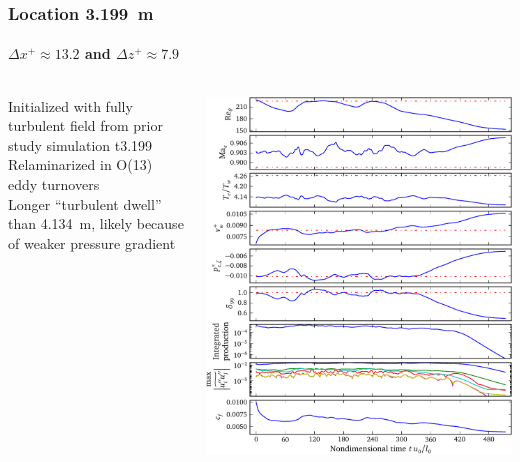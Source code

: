 \documentclass[mathserif]{beamer}
\begin{document}
\begin{frame}
    \frametitle{Location 3.199~m}
    \framesubtitle{$\Delta{}x^{+}\approx{}13.2$ and $\Delta{}z^{+}\approx{}7.9$}
    \begin{columns}[c,onlytextwidth]
    \begin{column}{.35\linewidth}
        \scriptsize
        Initialized with fully turbulent field from prior study simulation t3.199
        \\\bigskip
        Relaminarized in O(13) eddy turnovers
        \\\bigskip
        Longer ``turbulent dwell'' than 4.134~m,
        likely because of weaker pressure gradient
        \\\bigskip
    \end{column}
    \begin{column}{.65\linewidth}
        \vspace{-3.75em}
        \begin{flushright}
            \includegraphics[height=0.99\textheight]{redux3199}
        \end{flushright}
    \end{column}
    \end{columns}
\end{frame}
\end{document}
